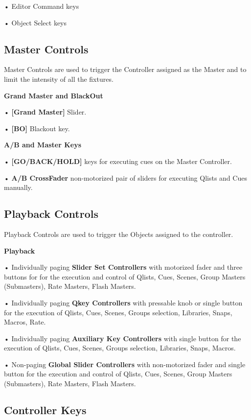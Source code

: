 \documentclass[
]{article}
\begin{document}
• Editor Command keys

• Object Select keys

\hypertarget{Master-Controls-2.5}{%
\subsection{Master Controls}\label{Master-Controls-2.5}}

Master Controls are used to trigger the Controller assigned as the Master and to limit the intensity of all the fixtures.

\textbf{Grand Master and BlackOut}

• \textbf{{[}Grand Master{]}} Slider.

• \textbf{{[}BO{]}} Blackout key.

\textbf{A/B and Master Keys}

• \textbf{{[}GO/BACK/HOLD{]}} keys for executing cues on the Master Controller.

• \textbf{A/B CrossFader} non-motorized pair of sliders for executing Qlists and Cues manually.

\hypertarget{Playback-Controls-2.6}{%
\subsection{Playback Controls}\label{Playback-Controls-2.6}}

Playback Controls are used to trigger the Objects assigned to the controller.

\textbf{Playback}

• Individually paging \textbf{Slider Set Controllers} with motorized fader and three buttons for for the execution and control of Qlists, Cues, Scenes, Group Masters (Submasters), Rate Masters, Flash Masters.

• Individually paging \textbf{Qkey Controllers} with pressable knob or single button for the execution of Qlists, Cues, Scenes, Groups selection, Libraries, Snaps, Macros, Rate.

• Individually paging \textbf{Auxiliary Key Controllers} with single button for the execution of Qlists, Cues, Scenes, Groups selection, Libraries, Snaps, Macros.

• Non-paging \textbf{Global Slider Controllers} with non-motorized fader and single button for the execution and control of Qlists, Cues, Scenes, Group Masters (Submasters), Rate Masters, Flash Masters.

\hypertarget{Controller-Keys-2.7}{%
\subsection{Controller Keys}\label{Controller-Keys-2.7}}
\end{document}
